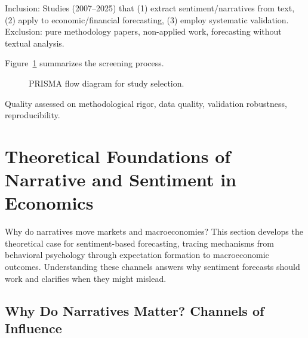 \documentclass[11pt]{article}
\begin{document}
Inclusion: Studies (2007--2025) that (1) extract sentiment/narratives from text, (2) apply to economic/financial forecasting, (3) employ systematic validation. Exclusion: pure methodology papers, non-applied work, forecasting without textual analysis.

Figure~\ref{fig:prisma} summarizes the screening process.

\begin{figure}[H]
\centering
\caption{PRISMA flow diagram for study selection.}
\label{fig:prisma}
\small
{}
\end{figure}

Quality assessed on methodological rigor, data quality, validation robustness, reproducibility.

\newpage
\section{Theoretical Foundations of Narrative and Sentiment in Economics}

Why do narratives move markets and macroeconomies? This section develops the theoretical case for sentiment-based forecasting, tracing mechanisms from behavioral psychology through expectation formation to macroeconomic outcomes. Understanding these channels answers why sentiment forecasts should work and clarifies when they might mislead.

\subsection{Why Do Narratives Matter? Channels of Influence}
\end{document}
